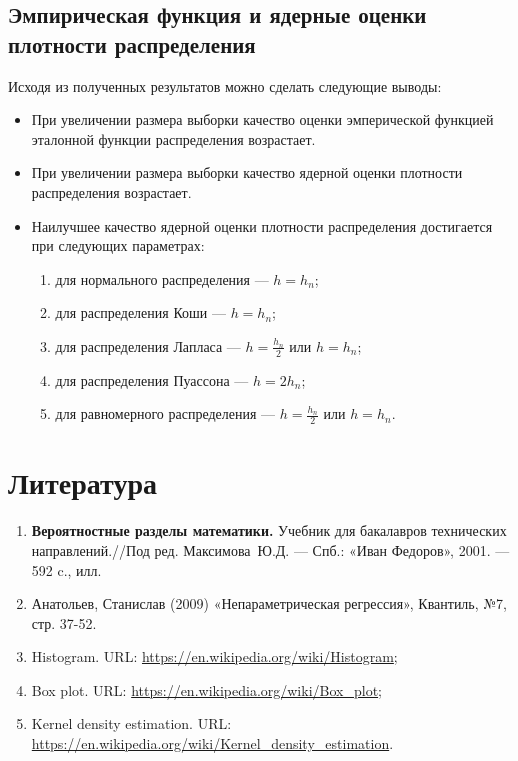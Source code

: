 \documentclass[12pt,a4paper]{article}
\begin{document}
	\subsection{Эмпирическая функция и ядерные оценки плотности распределения}
		Исходя из полученных результатов можно сделать следующие выводы:
		\begin{itemize}
			\item При увеличении размера выборки  качество оценки эмперической функцией эталонной функции распределения возрастает.
			
			\item При увеличении размера выборки  качество ядерной оценки плотности распределения возрастает.
			
			\item Наилучшее качество ядерной оценки плотности распределения достигается при следующих параметрах:
			\begin{enumerate}
				\item для нормального распределения --- $h=h_n$;
				
				\item для распределения Коши --- $h=h_n$;
				
				\item для распределения Лапласа --- $h=\frac{h_n}{2}$ или $h=h_n$;
				
				\item для распределения Пуассона --- $h=2h_n$;
				
				\item для равномерного распределения --- $h=\frac{h_n}{2}$ или $h=h_n$.
			\end{enumerate}
		\end{itemize}



\section{Литература}
	\begin{enumerate}
		\item \label{Book_1} \textbf{Вероятностные разделы математики.} Учебник для бакалавров технических направлений.//Под ред. Максимова~Ю.Д. --- Спб.: «Иван Федоров», 2001. --- 592 c., илл.
		
		\item \label{Book_2} Анатольев, Станислав (2009) «Непараметрическая регрессия», Квантиль, №7, стр. 37-52.
		
		\item \label{Histogram} Histogram. URL: \url{https://en.wikipedia.org/wiki/Histogram};
		
		\item \label{Box plot} Box plot. URL: \url{https://en.wikipedia.org/wiki/Box_plot};
		
		\item Kernel density estimation. URL: \url{https://en.wikipedia.org/wiki/Kernel_density_estimation}.
	\end{enumerate}
\end{document}
